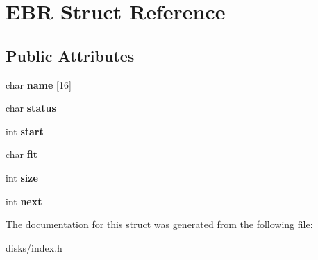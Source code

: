 \hypertarget{structEBR}{}\section{E\+BR Struct Reference}
\label{structEBR}
\subsection*{Public Attributes}
\begin{DoxyCompactItemize}
\item 
\mbox{\label{structEBR_a424b668c478fb095f726e4931e671e6f}} 
char {\bfseries name} \mbox{[}16\mbox{]}
\item 
\mbox{\label{structEBR_a7e8263addb859bc2e3ec7997c937dddc}} 
char {\bfseries status}
\item 
\mbox{\label{structEBR_aff99ac49b8abf7396e9ca61fd0682003}} 
int {\bfseries start}
\item 
\mbox{\label{structEBR_afe72f9429195e6995a62db9f5e5190cc}} 
char {\bfseries fit}
\item 
\mbox{\label{structEBR_a83a7e6369f07cb2ed71b69c9c887c427}} 
int {\bfseries size}
\item 
\mbox{\label{structEBR_a2b166e9d7ed9d1011a1792f246915b54}} 
int {\bfseries next}
\end{DoxyCompactItemize}


The documentation for this struct was generated from the following file\+:\begin{DoxyCompactItemize}
\item 
disks/index.\+h\end{DoxyCompactItemize}

